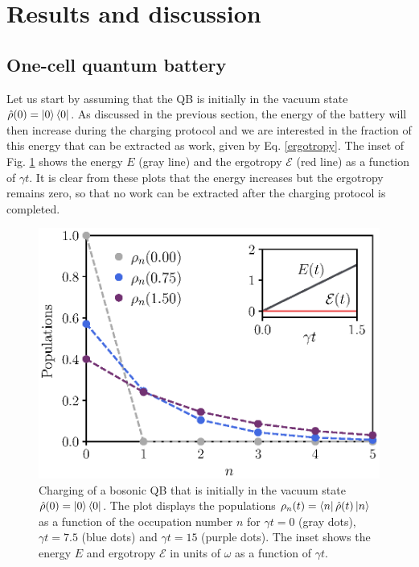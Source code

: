 \documentclass[%
reprint,
superscriptaddress,
amsmath,amssymb,
aps,
pra,
]{revtex4-2}
\begin{document}
\section{Results and discussion}

\subsection{One-cell quantum battery }
Let us start by assuming that the QB is initially in the vacuum state $\hat{\rho}(0) = \ket{0}\bra{0}$. As discussed in the previous section, the energy of the battery will then increase during the charging protocol and we are interested in the fraction of this energy that can be extracted as work, given by Eq. \eqref{ergotropy}. The inset of Fig. \ref{fig3} shows the energy $E$ (gray line) and the ergotropy $\mathcal{E}$ (red line) as a function of $\gamma t$.  It is clear from these plots that the energy increases but the ergotropy remains zero, so that no work can be extracted after the charging protocol is completed.

\begin{figure}[H]
\includegraphics[width=\linewidth]{fig3.eps}
\caption{Charging of a bosonic QB that is initially in the vacuum state $\hat{\rho}(0) = \ket{0}\bra{0}$. The plot displays the populations $\rho_{n}(t) = \bra{n}\hat{\rho}(t)\ket{n}$ as a function of the occupation number $n$ for $\gamma t = 0$ (gray dots), $\gamma t = 7.5$ (blue dots) and $\gamma t = 15$ (purple dots). The inset shows the energy $E$ and ergotropy $\mathcal{E}$ in units of $\omega$ as a function of $\gamma t$. }
\label{fig3}
\end{figure}
\end{document}
